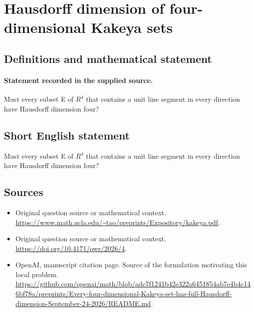 \documentclass[11pt]{article}
\begin{document}
\section*{Hausdorff dimension of four-dimensional Kakeya sets}\label{30007429}
\subsection{Definitions and mathematical statement}
\paragraph{Statement recorded in the supplied source.}
Must every subset E of $R^4$ that contains a unit line segment in every direction have Hausdorff dimension four?
\subsection{Short English statement}
Must every subset E of $R^4$ that contains a unit line segment in every direction have Hausdorff dimension four?
\subsection{Sources}
\begin{itemize}
\item[S1] Original question source or mathematical context.
\url{https://www.math.ucla.edu/~tao/preprints/Expository/kakeya.pdf}.
\item[S2] Original question source or mathematical context.
\url{https://doi.org/10.4171/owr/2026/4}.
\item[S3] OpenAI, manuscript citation page. Source of the formulation motivating this local problem.
\url{https://github.com/openai/math/blob/adc7f1241b42e322a6451854ab7e4b4c146bf78a/preprints/Every-four-dimensional-Kakeya-set-has-full-Hausdorff-dimension-September-24-2026/README.md}.
\end{itemize}
\end{document}
